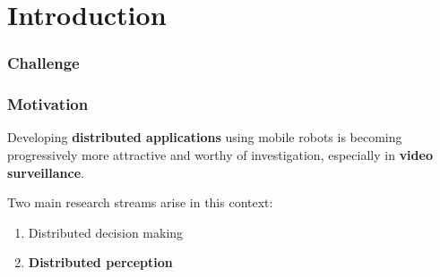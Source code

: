 \section{Introduction}

\begin{frame}
	\frametitle{Challenge}
	
	\begin{figure}
		\centering
	\end{figure}
\end{frame}

\begin{frame}
	\frametitle{Motivation}
	
	\Large
	
	Developing \textbf{distributed applications} using mobile robots is becoming progressively
	more attractive and worthy of investigation, especially in \textbf{video surveillance}. \\
	
	\vspace{0.4cm}
	
	Two main research streams arise in this context:
	
	\begin{enumerate}
		\item Distributed decision making
		\item \textbf{Distributed perception}
	\end{enumerate}
\end{frame}

